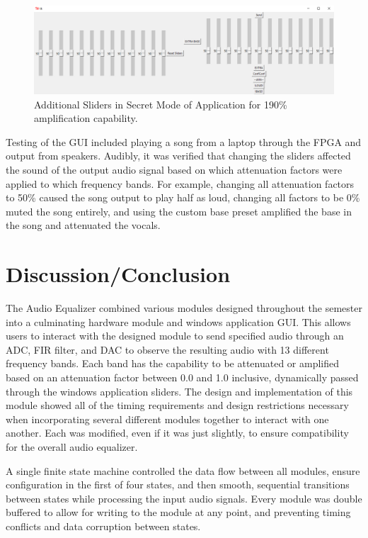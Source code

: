\documentclass[journal]{IEEEtran} %
\begin{document}
\begin{figure}[htbp]
\centering
\includegraphics[width=0.9\linewidth]{Figures/EQ/secret mode.PNG}
\caption{\label{fig:secret}Additional Sliders in Secret Mode of Application for 190\% amplification capability.}
\end{figure}

Testing of the GUI included playing a song from a laptop through the FPGA and output from speakers. Audibly, it was verified that changing the sliders affected the sound of the output audio signal based on which attenuation factors were applied to which frequency bands. For example, changing all attenuation factors to 50\% caused the song output to play half as loud, changing all factors to be 0\% muted the song entirely, and using the custom base preset amplified the base in the song and attenuated the vocals.

\section{Discussion/Conclusion}\label{sec:discussion}
The Audio Equalizer combined various modules designed throughout the semester into a culminating hardware module and windows application GUI. This allows users to interact with the designed module to send specified audio through an ADC, FIR filter, and DAC to observe the resulting audio with 13 different frequency bands. Each band has the capability to be attenuated or amplified based on an attenuation factor between 0.0 and 1.0 inclusive, dynamically passed through the windows application sliders. The design and implementation of this module showed all of the timing requirements and design restrictions necessary when incorporating several different modules together to interact with one another. Each was modified, even if it was just slightly, to ensure compatibility for the overall audio equalizer. 

A single finite state machine controlled the data flow between all modules, ensure configuration in the first of four states, and then smooth, sequential transitions between states while processing the input audio signals. Every module was double buffered to allow for writing to the module at any point, and preventing timing conflicts and data corruption between states.
\end{document}
